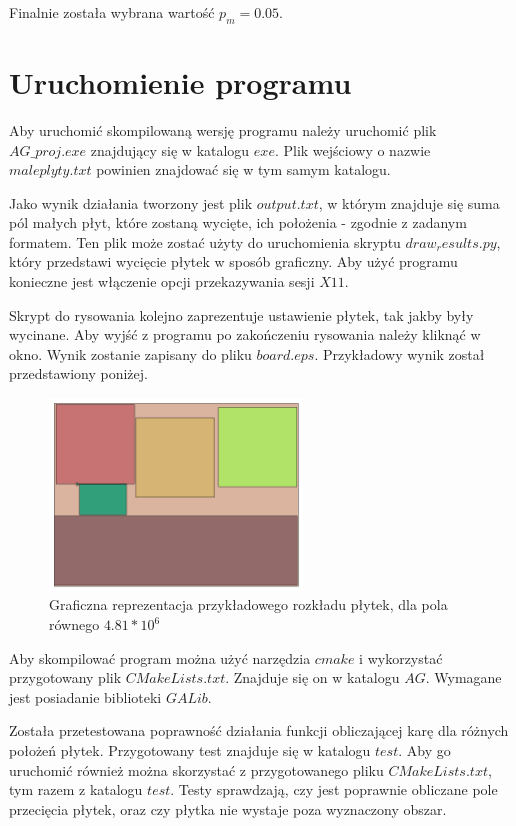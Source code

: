 \documentclass[11pt]{article}
\begin{document}
Finalnie została wybrana wartość $p_m = 0.05$.

\section{Uruchomienie programu}
Aby uruchomić skompilowaną wersję programu należy uruchomić plik $AG\_proj.exe$ znajdujący się w katalogu $exe$. Plik wejściowy o nazwie $maleplyty.txt$ powinien znajdować się w tym samym katalogu.

Jako wynik działania tworzony jest plik $output.txt$, w którym znajduje się suma pól małych płyt, które zostaną wycięte, ich położenia - zgodnie z zadanym formatem. Ten plik może zostać użyty do uruchomienia skryptu $draw_results.py$, który przedstawi wycięcie płytek w sposób graficzny. Aby użyć programu konieczne jest włączenie opcji przekazywania sesji $X11$. 

Skrypt do rysowania kolejno zaprezentuje ustawienie płytek, tak jakby były wycinane. Aby wyjść z programu po zakończeniu rysowania należy kliknąć w okno. Wynik zostanie zapisany do pliku $board.eps$. Przykładowy wynik został przedstawiony poniżej.

\begin{figure}[H]
\centering
\includegraphics[width=0.6\textwidth]{board.png}
\caption{Graficzna reprezentacja przykładowego rozkładu płytek, dla pola równego $4.81 * 10^6$}
\end{figure}

Aby skompilować program można użyć narzędzia $cmake$ i wykorzystać przygotowany plik $CMakeLists.txt$. Znajduje się on w katalogu $AG$. Wymagane jest posiadanie biblioteki $GALib$.

\vspace{0.5cm}

Została przetestowana poprawność działania funkcji obliczającej karę dla różnych położeń płytek. Przygotowany test znajduje się w katalogu $test$. Aby go uruchomić również można skorzystać z przygotowanego pliku $CMakeLists.txt$, tym razem z katalogu $test$. Testy sprawdzają, czy jest poprawnie obliczane pole przecięcia płytek, oraz czy płytka nie wystaje poza wyznaczony obszar.
\end{document}
